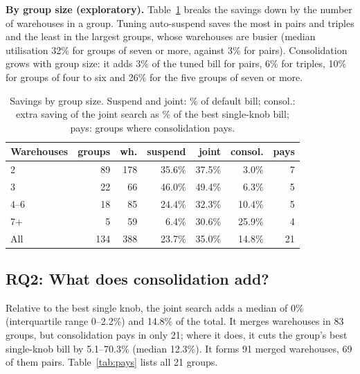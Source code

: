 \documentclass[conference]{IEEEtran}
\begin{document}
\textbf{By group size (exploratory).} Table~\ref{tab:byk} breaks the savings down by the number of warehouses in a group. Tuning
auto-suspend saves the most in pairs and triples and the least in the largest groups, whose warehouses are busier (median utilisation 32\% for groups of seven or more, against 3\% for pairs). Consolidation
grows with group size: it adds 3\% of the tuned bill for pairs, 6\% for triples, 10\% for groups of four to six and 26\% for
the five groups of seven or more.

\begin{table}[t]
\caption{Savings by group size. Suspend and joint: \% of default bill; consol.: extra saving of the joint search as \% of
the best single-knob bill; pays: groups where consolidation pays.}\label{tab:byk}
\centering\small
\setlength{\tabcolsep}{4pt}
\begin{tabular}{lrrrrrr}
\toprule
Warehouses & groups & wh. & suspend & joint & consol. & pays \\
\midrule
2       & 89 & 178 & 35.6\% & 37.5\% & 3.0\%  & 7 \\
3       & 22 & 66  & 46.0\% & 49.4\% & 6.3\%  & 5 \\
4--6    & 18 & 85  & 24.4\% & 32.3\% & 10.4\% & 5 \\
7+      & 5  & 59  & 6.4\%  & 30.6\% & 25.9\% & 4 \\
\midrule
All     & 134 & 388 & 23.7\% & 35.0\% & 14.8\% & 21 \\
\bottomrule
\end{tabular}
\end{table}

\subsection{RQ2: What does consolidation add?}\label{sec:rq2}
Relative to the best single knob, the joint search adds a median of 0\% (interquartile range 0--2.2\%) and 14.8\% of the
total. It merges warehouses in 83 groups, but consolidation pays in only 21; where it does, it cuts the group's best single-knob
bill by 5.1--70.3\% (median 12.3\%). It forms 91 merged warehouses, 69 of them pairs. Table~\ref{tab:pays} lists all 21
groups.
\end{document}
